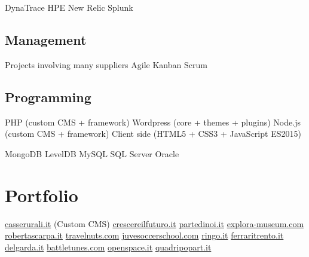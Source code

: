 \documentclass[letterpaper]{deedy-resume} %
\begin{document}
\begin{minipage}[t]{0.33\textwidth}

DynaTrace \textbullet{}
HPE \textbullet{}
New Relic \textbullet{}
Splunk

\sectionspace

\subsection{Management}

Projects involving many suppliers \textbullet{}
Agile \textbullet{}
Kanban \textbullet{} 
Scrum

\sectionspace

\subsection{Programming}

%
%
%


PHP (custom CMS + framework) \textbullet{}
Wordpress (core + themes + plugins) \textbullet{}
Node.js  (custom CMS + framework) \textbullet{}
Client side (HTML5 + CSS3 + JavaScript ES2015)

MongoDB \textbullet{}
LevelDB \textbullet{}
MySQL \textbullet{}
SQL Server \textbullet{} 
Oracle

\section{Portfolio}

\href{http://www.casserurali.it}{casserurali.it} (Custom CMS) \textbullet{} \href{http://www.crescereilfuturo.it}{crescereilfuturo.it} \textbullet{} \href{http://www.partedinoi.it}{partedinoi.it} \textbullet{} \href{http://www.explora-museum.com}{explora-museum.com} \textbullet{} \href{http://www.robertascarpa.it}{robertascarpa.it} \textbullet{} \href{http://www.travelnuts.com}{travelnuts.com} \textbullet{} \href{https://www.juvesoccerschool.com}{juvesoccerschool.com} \textbullet{} \href{http://www.ringo.it}{ringo.it} \textbullet{} \href{http://www.ferraritrento.it}{ferraritrento.it} \textbullet{} \href{http://www.delgarda.it}{delgarda.it} \textbullet{} \href{http://www.battletunes.com}{battletunes.com} \textbullet{} \href{http://www.openspace.it}{openspace.it} \textbullet{} \href{http://www.quadripopart.it}{quadripopart.it}


\end{minipage} %
\end{document}

